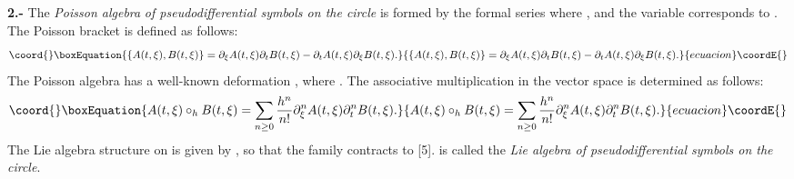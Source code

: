 \documentclass[a4paper,a4paper]{article}
\begin{document}
{\bf 2.-}  
The {\it Poisson algebra} \coordHE{} {\it of pseudodifferential symbols
on the circle} is formed by the formal series
\coordHE{}
where \coordHE{}, and the variable \myHighlight{$\xi$}\coordHE{} corresponds
to \coordHE{}. 
The Poisson bracket is defined as follows:
\begin{equation}\coord{}\boxEquation{
\lbrace A(t, \xi), B(t, \xi) \rbrace = 
\partial_{\xi}A(t, \xi)\partial_{t}B(t, \xi) -
\partial_tA(t, \xi)\partial_{\xi}B(t, \xi).
}{
\lbrace A(t, \xi), B(t, \xi) \rbrace = 
\partial_{\xi}A(t, \xi)\partial_{t}B(t, \xi) -
\partial_tA(t, \xi)\partial_{\xi}B(t, \xi).
}{ecuacion}\coordE{}\end{equation}
The Poisson algebra \coordHE{} has a well-known deformation \coordHE{},
where \myHighlight{$h\in \rbrack 0, 1]$}\coordHE{}.
The associative multiplication in the vector space \coordHE{}
is determined as follows:
\begin{equation}\coord{}\boxEquation{
A(t, \xi)\circ_h B(t, \xi) = 
\sum_{n\geq 0}\frac {h^n} {n!}\partial^n_{\xi}A(t, \xi)
\partial^n_{t}B(t, \xi). 
}{
A(t, \xi)\circ_h B(t, \xi) = 
\sum_{n\geq 0}\frac {h^n} {n!}\partial^n_{\xi}A(t, \xi)
\partial^n_{t}B(t, \xi). 
}{ecuacion}\coordE{}\end{equation}
The Lie algebra structure on \coordHE{} is given by
\coordHE{}, so that the family
\coordHE{} contracts to \coordHE{} [5]. \coordHE{} is called 
the  {\it Lie algebra of pseudodifferential symbols
on the circle}.
\end{document}
